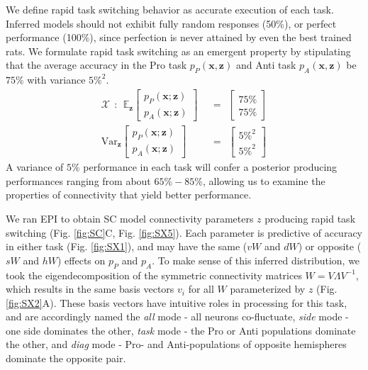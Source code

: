 \documentclass[11pt]{article}
\begin{document}
We define rapid task switching behavior as accurate execution of each task.  Inferred models should not exhibit fully random responses (50\%), or perfect performance (100\%), since perfection is never attained by even the best trained rats.
We formulate rapid task switching as an emergent property by stipulating that the average accuracy in the Pro task $p_P(\mathbf{x}, \mathbf{z})$ and Anti task $p_A(\mathbf{x}, \mathbf{z})$ be $75\%$ with variance $5\%^2$.
\begin{equation}\label{eq:EP}
\begin{split}
\mathcal{X} ~~:~~ \mathbb{E}_{\mathbf{z}}\begin{bmatrix} p_P(\mathbf{x}; \mathbf{z}) \\ p_A(\mathbf{x}; \mathbf{z}) \end{bmatrix}  &~~=~~  \begin{bmatrix} 75\% \\ 75\% \end{bmatrix}  \\ 
 \text{Var}_{\mathbf{z}}\begin{bmatrix} p_P(\mathbf{x}; \mathbf{z}) \\ p_A(\mathbf{x}; \mathbf{z}) \end{bmatrix}  &~~=~~  \begin{bmatrix} 5\%^2 \\ 5\%^2  \end{bmatrix}
\end{split}
\end{equation}
A variance of $5\%$ performance in each task will confer a posterior producing performances ranging from about $65\%-85\%$, allowing us to examine the properties of connectivity that yield better performance.

We ran EPI to obtain SC model connectivity parameters $z$ producing rapid task switching (Fig. \ref{fig:SC}C, Fig. \ref{fig:SX5}).
Each parameter is predictive of accuracy in either task (Fig. \ref{fig:SX1}), and may have the same ($vW$ and $dW$) or opposite ($sW$ and $hW$) effects on $p_P$ and $p_A$.
To make sense of this inferred distribution, we took the eigendecomposition of the symmetric connectivity matrices $W = V\Lambda V^{-1}$, which results in the same basis vectors $v_i$ for all $W$ parameterized by $z$ (Fig. \ref{fig:SX2}A). 
These basis vectors have intuitive roles in processing for this task, and are accordingly named the \textit{all} mode - all neurons co-fluctuate, \textit{side} mode - one side dominates the other, \textit{task} mode - the Pro or Anti populations dominate the other, and \textit{diag} mode - Pro- and Anti-populations of opposite hemispheres dominate the opposite pair. 
\end{document}
